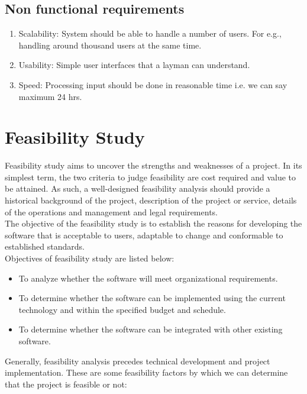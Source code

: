 \begin{itemize}
\begin{enumerate}
\end{enumerate}
\vskip 0.5cm
\subsection{Non functional requirements}
\begin{enumerate}
\item Scalability: System should be able to handle a number of users.
For e.g., handling around thousand users at the same time.
\item Usability: Simple user interfaces that a layman can understand.
\item Speed: Processing input should be done in reasonable time
 i.e. we can say maximum 24 hrs.
\end{enumerate}
\end{itemize}



\section{Feasibility Study}
Feasibility study aims to uncover the strengths and weaknesses of
a project. In its simplest term, the two criteria to judge feasibility
are cost required and value to be attained. As such, a well-designed
feasibility analysis should provide a historical background of the
project, description of the project or service, details of the
operations and management and legal requirements.\\

The objective of the feasibility study is to establish the reasons for developing the software that is acceptable to users, adaptable to change and conformable to established standards.\\
Objectives of feasibility study are listed below:
\begin{itemize}
        \item To analyze whether the software will meet organizational requirements.
        \item To determine whether the software can be implemented using the current technology and within the specified budget and schedule.
        \item To determine whether the software can be integrated with other existing software.
\end{itemize}


Generally, feasibility
analysis precedes technical development and project implementation.
These are some feasibility factors by which we can determine that
the project is feasible or not:

